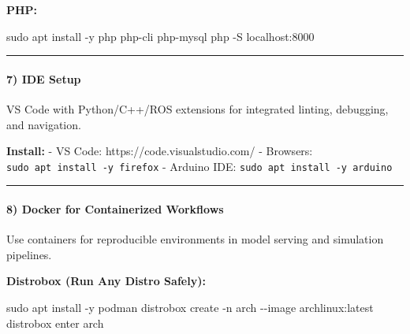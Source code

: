 \documentclass[
  english,
  paper=a4,
  oneside  ,captions=tableheading
]{scrartcl}
\newenvironment{Shaded}{}{}
\newcommand{\AttributeTok}[1]{\textcolor[rgb]{0.49,0.56,0.16}{#1}}
\newcommand{\ExtensionTok}[1]{#1}
\newcommand{\FunctionTok}[1]{\textcolor[rgb]{0.02,0.16,0.49}{#1}}
\newcommand{\NormalTok}[1]{#1}
\newcommand{\VariableTok}[1]{\textcolor[rgb]{0.10,0.09,0.49}{#1}}
\begin{document}
\textbf{PHP:}

\begin{Shaded}
\begin{Highlighting}[]
\FunctionTok{sudo}\NormalTok{ apt install }\AttributeTok{{-}y}\NormalTok{ php php{-}cli php{-}mysql}
\ExtensionTok{php} \AttributeTok{{-}S}\NormalTok{ localhost:8000}
\end{Highlighting}
\end{Shaded}

\begin{center}\rule{0.5\linewidth}{0.5pt}\end{center}

\paragraph{7) IDE Setup}\label{ide-setup}

VS Code with Python/C++/ROS extensions for integrated linting,
debugging, and navigation.

\textbf{Install:} - VS Code: https://code.visualstudio.com/ - Browsers:
\texttt{sudo\ apt\ install\ -y\ firefox} - Arduino IDE:
\texttt{sudo\ apt\ install\ -y\ arduino}

\begin{center}\rule{0.5\linewidth}{0.5pt}\end{center}

\paragraph{8) Docker for Containerized
Workflows}\label{docker-for-containerized-workflows}

Use containers for reproducible environments in model serving and
simulation pipelines.

\begin{Shaded}
\end{Shaded}

\textbf{Distrobox (Run Any Distro Safely):}

\begin{Shaded}
\begin{Highlighting}[]
\FunctionTok{sudo}\NormalTok{ apt install }\AttributeTok{{-}y}\NormalTok{ podman}
\ExtensionTok{distrobox}\NormalTok{ create }\AttributeTok{{-}n}\NormalTok{ arch }\AttributeTok{{-}{-}image}\NormalTok{ archlinux:latest}
\ExtensionTok{distrobox}\NormalTok{ enter arch}
\end{Highlighting}
\end{Shaded}
\end{document}
